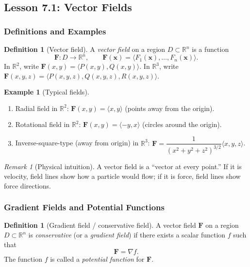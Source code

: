 \documentclass[12pt]{article}
\numberwithin{equation}{section}
\newcommand{\RR}{\mathbb{R}}
\newcommand{\vect}[1]{\boldsymbol{#1}}   %
\theoremstyle{plain}
\theoremstyle{definition}
\newtheorem{definition}[theorem]{Definition}
\newtheorem{example}[theorem]{Example}
\theoremstyle{remark}
\newtheorem{remark}[theorem]{Remark}
\begin{document}
\subsection{Lesson 7.1: Vector Fields}

\subsubsection{Definitions and Examples}

\begin{definition}[Vector field]
A \emph{vector field} on a region $D\subset\RR^n$ is a function
\[
\vect F:D\to\RR^n,\qquad \vect F(\vect x)=\langle F_1(\vect x),\dots,F_n(\vect x)\rangle.
\]
In $\RR^2$, write $\vect F(x,y)=\langle P(x,y),Q(x,y)\rangle$.  
In $\RR^3$, write $\vect F(x,y,z)=\langle P(x,y,z),Q(x,y,z),R(x,y,z)\rangle$.
\end{definition}

\begin{example}[Typical fields]
\begin{enumerate}[label=(\alph*)]
\item Radial field in $\RR^2$: $\vect F(x,y)=\langle x,y\rangle$ (points away from the origin).
\item Rotational field in $\RR^2$: $\vect F(x,y)=\langle -y,x\rangle$ (circles around the origin).
\item Inverse-square-type (away from origin) in $\RR^3$: $\vect F=\dfrac{1}{(x^2+y^2+z^2)^{3/2}}\langle x,y,z\rangle$.
\end{enumerate}
\end{example}

\begin{remark}[Physical intuition]
A vector field is a “vector at every point.” If it is velocity, field lines show how a particle would flow; if it is force, field lines show force directions.
\end{remark}

\subsubsection{Gradient Fields and Potential Functions}

\begin{definition}[Gradient field / conservative field]\label{def:conservative}
A vector field $\vect F$ on a region $D\subset\RR^n$ is \emph{conservative} (or a \emph{gradient field}) if there exists a scalar function $f$ such that
\[
\vect F=\nabla f.
\]
The function $f$ is called a \emph{potential function} for $\vect F$.
\end{definition}
\end{document}
